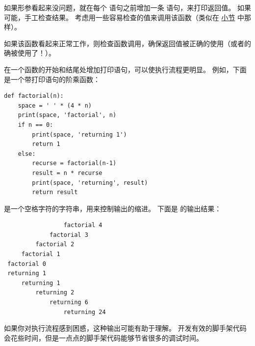如果形参看起来没问题，就在每个  语句之前增加一条  语句，来打印返回值。
如果可能，手工检查结果。
考虑用一些容易检查的值来调用该函数（类似在 \hyperref[incremental.development]{小节} 中那样）。



如果该函数看起来正常工作，则检查函数调用，确保返回值被正确的使用（或者的确被使用了！）。


在一个函数的开始和结尾处增加打印语句，可以使执行流程更明显。
例如，下面是一个带打印语句的阶乘函数：

\begin{lstlisting}
def factorial(n):
    space = ' ' * (4 * n)
    print(space, 'factorial', n)
    if n == 0:
        print(space, 'returning 1')
        return 1
    else:
        recurse = factorial(n-1)
        result = n * recurse
        print(space, 'returning', result)
        return result
\end{lstlisting}

%

 是一个空格字符的字符串，用来控制输出的缩进。 下面是  的输出结果：


\begin{lstlisting}
                 factorial 4
             factorial 3
         factorial 2
     factorial 1
 factorial 0
 returning 1
     returning 1
         returning 2
             returning 6
                 returning 24
\end{lstlisting}

%

如果你对执行流程感到困惑，这种输出可能有助于理解。
开发有效的脚手架代码会花些时间，但是一点点的脚手架代码能够节省很多的调试时间。

